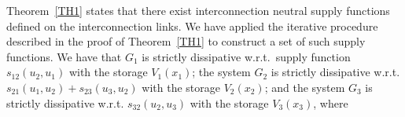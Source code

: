 \documentclass[11pt,a4paper,oneside,DIV=12,headings=small]{scrartcl}
\theoremstyle{plain}
\begin{document}
Theorem~\ref{TH1} states that there exist interconnection neutral supply functions defined on the interconnection links. We have applied the iterative procedure described in the proof of Theorem~\ref{TH1} to construct a set of such supply functions. We have that $G_1$ is strictly dissipative w.r.t.\ supply function $s_{12}(u_2,u_1)$ with the storage $V_1(x_1)$; the system $G_2$ is strictly dissipative w.r.t. $s_{21}(u_1,u_2)+s_{23}(u_3,u_2)$ with the storage $V_2(x_2)$; and the system $G_3$ is strictly dissipative w.r.t. $s_{32}(u_2,u_3)$ with the storage $V_3(x_3)$, where
%
%
\end{document}
